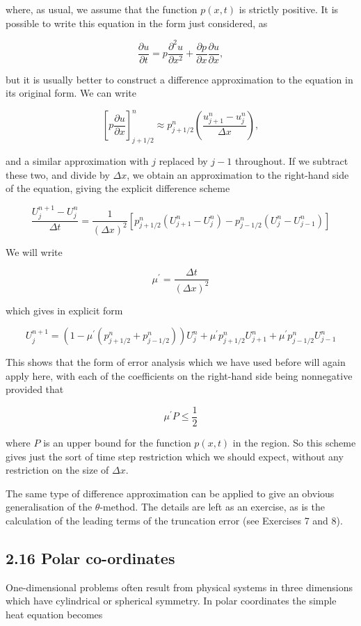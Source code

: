 \documentclass[10pt]{article}
\begin{document}
where, as usual, we assume that the function \(p(x, t)\) is strictly positive. It is possible to write this equation in the form just considered, as

\[
\frac{\partial u}{\partial t}=p \frac{\partial^{2} u}{\partial x^{2}}+\frac{\partial p}{\partial x} \frac{\partial u}{\partial x},
\]

but it is usually better to construct a difference approximation to the equation in its original form. We can write

\[
\left[p \frac{\partial u}{\partial x}\right]_{j+1 / 2}^{n} \approx p_{j+1 / 2}^{n}\left(\frac{u_{j+1}^{n}-u_{j}^{n}}{\Delta x}\right),
\]

and a similar approximation with \(j\) replaced by \(j-1\) throughout. If we subtract these two, and divide by \(\Delta x\), we obtain an approximation to the right-hand side of the equation, giving the explicit difference scheme

\[
\frac{U_{j}^{n+1}-U_{j}^{n}}{\Delta t}=\frac{1}{(\Delta x)^{2}}\left[p_{j+1 / 2}^{n}\left(U_{j+1}^{n}-U_{j}^{n}\right)-p_{j-1 / 2}^{n}\left(U_{j}^{n}-U_{j-1}^{n}\right)\right]
\]

We will write

\[
\mu^{\prime}=\frac{\Delta t}{(\Delta x)^{2}}
\]

which gives in explicit form

\[
U_{j}^{n+1}=\left(1-\mu^{\prime}\left(p_{j+1 / 2}^{n}+p_{j-1 / 2}^{n}\right)\right) U_{j}^{n}+\mu^{\prime} p_{j+1 / 2}^{n} U_{j+1}^{n}+\mu^{\prime} p_{j-1 / 2}^{n} U_{j-1}^{n}
\]

This shows that the form of error analysis which we have used before will again apply here, with each of the coefficients on the right-hand side being nonnegative provided that

\[
\mu^{\prime} P \leq \frac{1}{2}
\]

where \(P\) is an upper bound for the function \(p(x, t)\) in the region. So this scheme gives just the sort of time step restriction which we should expect, without any restriction on the size of \(\Delta x\).

The same type of difference approximation can be applied to give an obvious generalisation of the \(\theta\)-method. The details are left as an exercise, as is the calculation of the leading terms of the truncation error (see Exercises 7 and 8).

\subsection*{2.16 Polar co-ordinates}
One-dimensional problems often result from physical systems in three dimensions which have cylindrical or spherical symmetry. In polar coordinates the simple heat equation becomes
\end{document}
